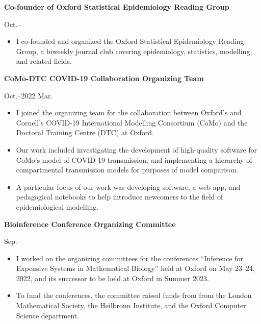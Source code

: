 \documentclass[11pt]{article}
\begin{document}
\vspace{0.2cm}


\noindent\parbox{.75\textwidth}{\raggedright \textbf{Co-founder of Oxford Statistical Epidemiology Reading Group\\ \vspace{.1cm}}}
\parbox{.25\textwidth}{ Oct.--}
\vspace{-.65cm}
\begin{itemize}
\setlength{\itemsep}{4pt}
\setlength{\parskip}{0pt}
\setlength{\parsep}{0pt}
\item I co-founded and organized the Oxford Statistical Epidemiology Reading Group, a biweekly journal club covering epidemiology, statistics, modelling, and related fields.
\end{itemize}


\vspace{0.2cm}


\noindent\parbox{.75\textwidth}{\raggedright \textbf{CoMo-DTC COVID-19 Collaboration Organizing Team}}
\parbox{.25\textwidth}{ Oct.--2022 Mar.}
\vspace{-.65cm}
\begin{itemize}
\setlength{\itemsep}{4pt}
\setlength{\parskip}{0pt}
\setlength{\parsep}{0pt}
\item I joined the organizing team for the collaboration between Oxford's and Cornell's COVID-19 International Modelling Consortium (CoMo) and the Doctoral Training Centre (DTC) at Oxford.
\item Our work included investigating the development of high-quality software for CoMo's model of COVID-19 transmission, and implementing a hierarchy of compartmental transmission models for purposes of model comparison. 
\item A particular focus of our work was developing software, a web app, and pedagogical notebooks to help introduce newcomers to the field of epidemiological modelling.
\end{itemize}




\vspace{.2cm}


\noindent\parbox{.75\textwidth}{\raggedright \textbf{Bioinference Conference Organizing Committee\\ \vspace{.1cm}}}
\parbox{.25\textwidth}{ Sep.--}
\vspace{-.65cm}
\begin{itemize}
\setlength{\itemsep}{4pt}
\setlength{\parskip}{0pt}
\setlength{\parsep}{0pt}
\item I worked on the organizing committees for the conferences ``Inference for Expensive Systems in Mathematical Biology'' held at Oxford on May 23--24, 2022, and its successor to be held at Oxford in Summer 2023.
\item To fund the conferences, the committee raised funds from from the London Mathematical Society, the Heilbronn Institute, and the Oxford Computer Science department.
\end{itemize}
\end{document}

